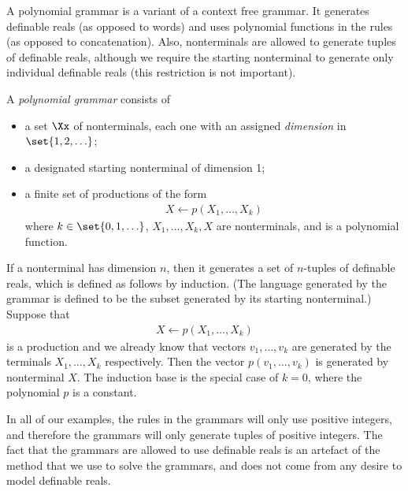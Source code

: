 A polynomial grammar is a variant of a context free grammar. It generates  definable reals (as opposed to words) and  uses polynomial functions in the rules (as opposed to concatenation). Also, nonterminals are allowed to generate tuples of definable reals, although we require the starting nonterminal to generate only individual definable reals (this restriction is not important).
\begin{definition}
	A \emph{polynomial grammar} consists of 
	\begin{itemize}
		\item a set $\Xx$ of nonterminals, each one with an assigned \emph{dimension} in $\set{1,2,\ldots}$;
		\item a designated starting nonterminal of dimension 1;
		\item a finite set of productions of the form
	\begin{align*}
	X \leftarrow p(X_1,\ldots,X_k)
\end{align*}
where  $k \in \set{0,1,\ldots}$,  $X_1,\ldots,X_k,X$ are nonterminals, and
 is a polynomial function.
	\end{itemize}
\end{definition}
If a nonterminal has dimension $n$, then it   generates a set of $n$-tuples of definable reals, which  is defined as follows by induction. (The language generated by the grammar is  defined to be the subset generated by its starting nonterminal.) Suppose that
\begin{align*}
  	X \leftarrow p(X_1,\ldots,X_k)
\end{align*}
is a production and we already know that vectors $v_1,\ldots,v_k$ are generated by the terminals $X_1,\ldots,X_k$ respectively. Then the vector $p(v_1,\ldots,v_k)$ is generated by nonterminal $X$.  The induction base is the  special case of $k=0$, where the polynomial $p$ is a constant.  

In all of our examples, the rules in the grammars will only use positive integers, and therefore the grammars will only generate tuples of positive integers. The fact that the grammars are allowed to use definable reals is  an artefact of the method that we use to solve the grammars, and does not come from any desire to model definable reals.


